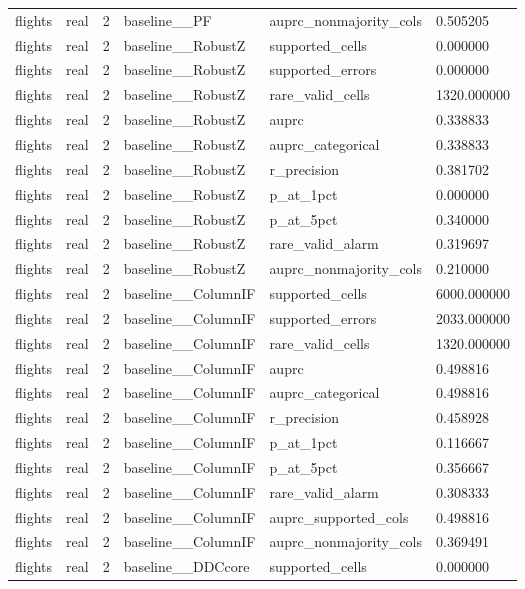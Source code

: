 \begin{tabular}{llllll}
flights & real & 2 & baseline\_\_PF & auprc\_nonmajority\_cols & 0.505205 \\
flights & real & 2 & baseline\_\_RobustZ & supported\_cells & 0.000000 \\
flights & real & 2 & baseline\_\_RobustZ & supported\_errors & 0.000000 \\
flights & real & 2 & baseline\_\_RobustZ & rare\_valid\_cells & 1320.000000 \\
flights & real & 2 & baseline\_\_RobustZ & auprc & 0.338833 \\
flights & real & 2 & baseline\_\_RobustZ & auprc\_categorical & 0.338833 \\
flights & real & 2 & baseline\_\_RobustZ & r\_precision & 0.381702 \\
flights & real & 2 & baseline\_\_RobustZ & p\_at\_1pct & 0.000000 \\
flights & real & 2 & baseline\_\_RobustZ & p\_at\_5pct & 0.340000 \\
flights & real & 2 & baseline\_\_RobustZ & rare\_valid\_alarm & 0.319697 \\
flights & real & 2 & baseline\_\_RobustZ & auprc\_nonmajority\_cols & 0.210000 \\
flights & real & 2 & baseline\_\_ColumnIF & supported\_cells & 6000.000000 \\
flights & real & 2 & baseline\_\_ColumnIF & supported\_errors & 2033.000000 \\
flights & real & 2 & baseline\_\_ColumnIF & rare\_valid\_cells & 1320.000000 \\
flights & real & 2 & baseline\_\_ColumnIF & auprc & 0.498816 \\
flights & real & 2 & baseline\_\_ColumnIF & auprc\_categorical & 0.498816 \\
flights & real & 2 & baseline\_\_ColumnIF & r\_precision & 0.458928 \\
flights & real & 2 & baseline\_\_ColumnIF & p\_at\_1pct & 0.116667 \\
flights & real & 2 & baseline\_\_ColumnIF & p\_at\_5pct & 0.356667 \\
flights & real & 2 & baseline\_\_ColumnIF & rare\_valid\_alarm & 0.308333 \\
flights & real & 2 & baseline\_\_ColumnIF & auprc\_supported\_cols & 0.498816 \\
flights & real & 2 & baseline\_\_ColumnIF & auprc\_nonmajority\_cols & 0.369491 \\
flights & real & 2 & baseline\_\_DDCcore & supported\_cells & 0.000000 \\

\end{tabular}

